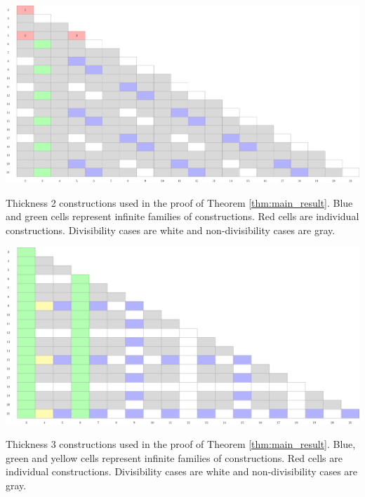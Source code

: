 \begin{table}[]
\centering
\includegraphics[width=\textwidth]{tables/2/thickness_2.pdf}
\caption{Thickness 2 constructions used in the proof of Theorem \ref{thm:main_result}. Blue and green cells represent infinite families of constructions. Red cells are individual constructions. Divisibility cases are white and non-divisibility cases are gray.}
\label{tab:integral_bounds_2}
\end{table} 

\begin{table}[]
\centering
\includegraphics[width=\textwidth]{tables/2/thickness_3.pdf}
\caption{Thickness 3 constructions used in the proof of Theorem \ref{thm:main_result}. Blue, green and yellow cells represent infinite families of constructions. Red cells are individual constructions. Divisibility cases are white and non-divisibility cases are gray.}
\label{tab:integral_bounds_3}
\end{table} 

